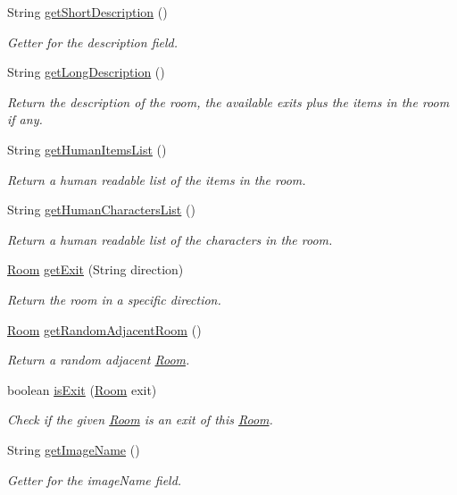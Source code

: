 \begin{DoxyCompactItemize}
String \hyperlink{classpkg__world_1_1Room_adb98ed16e34549faabed35f90673d266}{get\-Short\-Description} ()
\begin{DoxyCompactList}\small\item\em Getter for the description field. \end{DoxyCompactList}\item 
String \hyperlink{classpkg__world_1_1Room_acc8ee9123c9a77428c1e66fbba34aeac}{get\-Long\-Description} ()
\begin{DoxyCompactList}\small\item\em Return the description of the room, the available exits plus the items in the room if any. \end{DoxyCompactList}\item 
String \hyperlink{classpkg__world_1_1Room_a3ea436ad00d00484b429992ef94535ac}{get\-Human\-Items\-List} ()
\begin{DoxyCompactList}\small\item\em Return a human readable list of the items in the room. \end{DoxyCompactList}\item 
String \hyperlink{classpkg__world_1_1Room_a1ddbdc5022f7f494ac6250ca3f42672c}{get\-Human\-Characters\-List} ()
\begin{DoxyCompactList}\small\item\em Return a human readable list of the characters in the room. \end{DoxyCompactList}\item 
\hyperlink{classpkg__world_1_1Room}{Room} \hyperlink{classpkg__world_1_1Room_ae05ae991a1692ffb29e8aef632d18b95}{get\-Exit} (String direction)
\begin{DoxyCompactList}\small\item\em Return the room in a specific direction. \end{DoxyCompactList}\item 
\hyperlink{classpkg__world_1_1Room}{Room} \hyperlink{classpkg__world_1_1Room_a00952ff3743ec6cd8d238dada7506f63}{get\-Random\-Adjacent\-Room} ()
\begin{DoxyCompactList}\small\item\em Return a random adjacent \hyperlink{classpkg__world_1_1Room}{Room}. \end{DoxyCompactList}\item 
boolean \hyperlink{classpkg__world_1_1Room_a305aab25719c2b75a0c28c9a53a3c9d3}{is\-Exit} (\hyperlink{classpkg__world_1_1Room}{Room} exit)
\begin{DoxyCompactList}\small\item\em Check if the given \hyperlink{classpkg__world_1_1Room}{Room} is an exit of this \hyperlink{classpkg__world_1_1Room}{Room}. \end{DoxyCompactList}\item 
String \hyperlink{classpkg__world_1_1Room_a5d1a496c1fd2e4ba73177e1182c9f4f1}{get\-Image\-Name} ()
\begin{DoxyCompactList}\small\item\em Getter for the image\-Name field. \end{DoxyCompactList}\end{DoxyCompactItemize}
